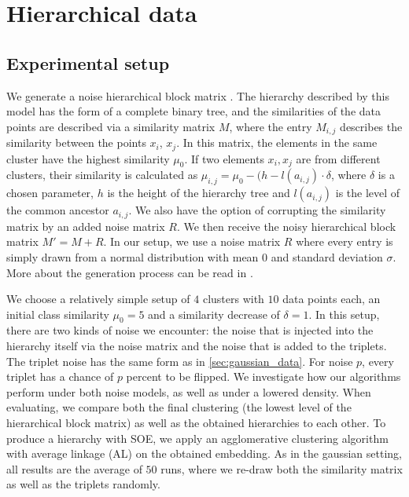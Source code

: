 \section{Hierarchical data}\label{sec:hierarchical_data}
\subsection{Experimental setup}\label{sec:hierarchical_setup}
We generate a noise hierarchical block matrix \citep{balakrishnanNoiseThresholdsSpectral2011}.
The hierarchy described by this model has the form of a complete binary tree, and the similarities of the data points are described via a similarity matrix $M$, 
where the entry $M_{i,j}$ describes the similarity between the points $x_i$, $x_j$.
In this matrix, the elements in the same cluster have the highest similarity $\mu_0$. If two elements $x_i, x_j$ are from different clusters,
their similarity is calculated as $\mu_{i,j} = \mu_0 - (h - l(a_{i,j}) \cdot \delta$, where $\delta$ is a chosen parameter, $h$ is the height of the hierarchy tree and $l(a_{i,j})$
is the level of the common ancestor $a_{i,j}$.
We also have the option of corrupting the similarity matrix by 
an added noise matrix $R$. We then receive the noisy hierarchical block matrix $M' = M + R$. 
In our setup, we use a noise matrix $R$ where every entry is simply drawn from a normal distribution with mean $0$ and standard deviation $\sigma$.
More about the generation process can be read in \cite{ghoshdastidarFoundationsComparisonBasedHierarchical2019}.

We choose a relatively simple setup of $4$ clusters with $10$ data points each, an initial class similarity $\mu_0 = 5$ and a similarity decrease of $\delta = 1$.
In this setup, there are two kinds of noise we encounter: the noise that is injected into the hierarchy itself via the noise matrix and the noise that is added to the triplets.
The triplet noise has the same form as in \autoref{sec:gaussian_data}. For noise $p$, every triplet has a chance of $p$ percent to be flipped. 
We investigate how our algorithms perform under both noise models, as well as under a lowered density.  
When evaluating, we compare both the final clustering (the lowest level of the hierarchical block matrix) as well as the obtained hierarchies to each other. 
To produce a hierarchy with SOE, we apply an agglomerative clustering algorithm with average linkage (AL) on the obtained embedding.
As in the gaussian setting, all results are the average of $50$ runs, where we re-draw both the similarity matrix as well as the triplets randomly. 

